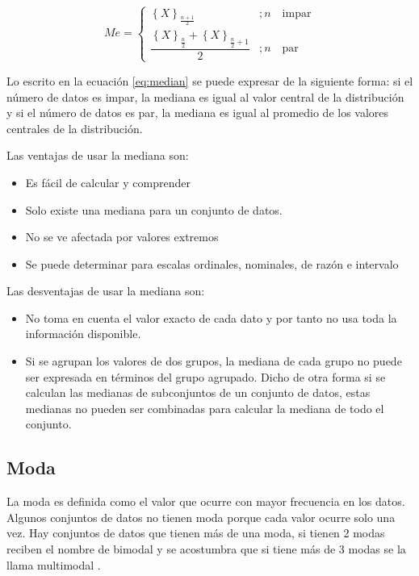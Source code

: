\documentclass[
]{krantz}
\providecommand{\tightlist}{%
  \setlength{\itemsep}{0pt}\setlength{\parskip}{0pt}}
\begin{document}
\begin{equation}
Me = \begin{cases} 
      \left \{ X \right\}_{\frac{n+1}{2}} & ; n \quad \textrm{impar}  \\
      \dfrac{\left \{ X  \right \}_{\frac{n}{2}} + \left \{ X  \right \}_{\frac{n}{2}+1} }{2} & ; n \quad \textrm{par}
   \end{cases}
   \label{eq:median}
\end{equation}

Lo escrito en la ecuación \eqref{eq:median} se puede expresar de la siguiente forma: si el número de datos es impar, la mediana es igual al valor central de la distribución y si el número de datos es par, la mediana es igual al promedio de los valores centrales de la distribución.

Las ventajas de usar la mediana son:

\begin{itemize}
\tightlist
\item
  Es fácil de calcular y comprender
\item
  Solo existe una mediana para un conjunto de datos.
\item
  No se ve afectada por valores extremos
\item
  Se puede determinar para escalas ordinales, nominales, de razón e intervalo
\end{itemize}

Las desventajas de usar la mediana son:

\begin{itemize}
\tightlist
\item
  No toma en cuenta el valor exacto de cada dato y por tanto no usa toda la información disponible.
\item
  Si se agrupan los valores de dos grupos, la mediana de cada grupo no puede ser expresada en términos del grupo agrupado. Dicho de otra forma si se calculan las medianas de subconjuntos de un conjunto de datos, estas medianas no pueden ser combinadas para calcular la mediana de todo el conjunto. \citep{zurita2010}
\end{itemize}

\hypertarget{moda}{%
\subsection{Moda}\label{moda}}

La moda es definida como el valor que ocurre con mayor frecuencia en los datos. Algunos conjuntos de datos no tienen moda porque cada valor ocurre solo una vez. Hay conjuntos de datos que tienen más de una moda, si tienen 2 modas reciben el nombre de bimodal y se acostumbra que si tiene más de 3 modas se la llama multimodal \citep{siegel2016}.
\end{document}
